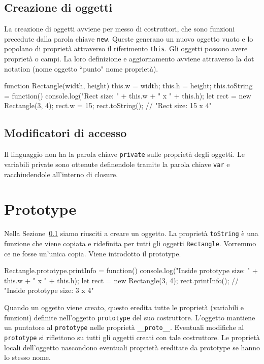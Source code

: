 \subsection{Creazione di oggetti}\label{sec:js:createobj}

La creazione di oggetti avviene per messo di costruttori, che sono funzioni precedute dalla parola chiave \texttt{new}. Queste generano un nuovo oggetto vuoto e lo popolano di proprietà attraverso il riferimento \texttt{this}. Gli oggetti possono avere proprietà o campi. La loro definizione e aggiornamento avviene attraverso la dot notation (nome oggetto ``punto" nome proprietà). 
\begin{javascriptcode}
function Rectangle(width, height) {
    this.w = width;
    this.h = height;
    this.toString = function() { 
        console.log("Rect size: " + this.w + " x " + this.h); 
    }
}
let rect = new Rectangle(3, 4);
rect.w = 15;
rect.toString(); // "Rect size: 15 x 4"
\end{javascriptcode}

\subsection{Modificatori di accesso}

Il linguaggio non ha la parola chiave \texttt{private} sulle proprietà degli oggetti. Le variabili private sono ottenute definendole tramite la parola chiave \texttt{var} e racchiudendole all'interno di closure.

\section{Prototype}

Nella Sezione~\ref{sec:js:createobj} siamo riusciti a creare un oggetto. La proprietà \texttt{toString} è una funzione che viene copiata e ridefinita per tutti gli oggetti \texttt{Rectangle}. Vorremmo ce ne fosse un'unica copia. Viene introdotto il prototype.
\begin{javascriptcode}
Rectangle.prototype.printInfo = function() { 
    console.log("Inside prototype size: " + this.w + " x " + this.h); 
}
let rect = new Rectangle(3, 4);
rect.printInfo(); // "Inside prototype size: 3 x 4"
\end{javascriptcode}
Quando un oggetto viene creato, questo eredita tutte le proprietà (variabili e funzioni) definite nell'oggetto \texttt{prototype} del suo costruttore. L'oggetto mantiene un puntatore al \texttt{prototype} nelle proprietà \texttt{__proto__}. Eventuali modifiche al \texttt{prototype} si riflettono su tutti gli oggetti creati con tale costruttore. Le proprietà locali dell'oggetto nascondono eventuali proprietà ereditate da prototype se hanno lo stesso nome. 

